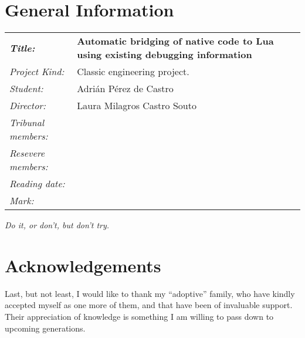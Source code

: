 \documentclass[a4paper,
	fontsize=12pt,
	titlepage=firstiscover,
	chapterprefix=true,
	appendixprefix=true,
	headings=big,
	headsepline,
	toc=bibliographynumbered,
	twoside]{scrbook}
\newcommand\PfcTitle[0]{%
Automatic bridging of native code to Lua
using existing debugging information\relax}
\newcommand\PfcAuthor[0]{%
Adrián Pérez de Castro\relax}
\newcommand\PfcDirector[0]{%
Laura Milagros Castro Souto\relax}
\begin{document}
\frontmatter

\cleardoublepage
\chapter*{General Information}

\vspace{1cm}
\begin{tabular}{p{}p{}}
	\textbf{\textit{Title:}} & \textbf{\PfcTitle} \vspace{0.5cm} \\
	\textit{Project Kind:} & Classic engineering project. \vspace{0.5cm} \\
	\textit{Student:}      & \PfcAuthor \vspace{0.5cm} \\
	\textit{Director:}     & \PfcDirector \vspace{0.5cm} \\
	\textit{Tribunal members:} & \vspace{3cm} \\
	\textit{Resevere members:} & \vspace{3cm} \\
	\textit{Reading date:} & \vspace{0.5cm}   \\
	\textit{Mark:} & \\
\end{tabular}

\cleardoublepage


\cleardoublepage
\begin{minipage}[t][6cm][l]{\textwidth}
	\vspace{10cm}
	\begin{flushright}
		\textit{Do it, or don't, but don't try.}
	\end{flushright}
\end{minipage}

\cleardoublepage
\chapter*{Acknowledgements}

Last, but not least, I would like to thank my “adoptive” family, who have
kindly accepted myself as one more of them, and that have been of invaluable
support. Their appreciation of knowledge is something I am willing to pass
down to upcoming generations.
\end{document}
